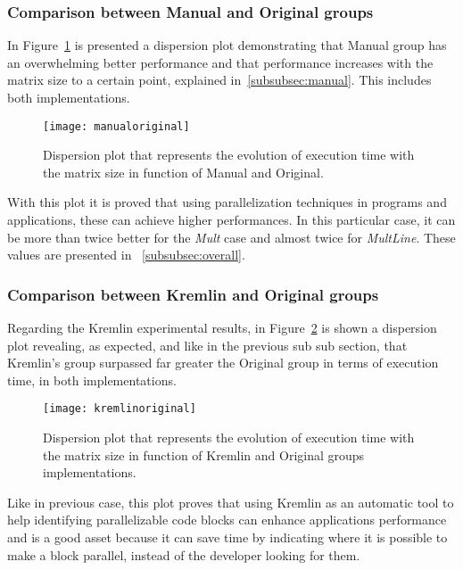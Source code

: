 \subsubsection{Comparison between Manual and Original groups}

In Figure~\ref{fig:manualoriginal} is presented a dispersion plot 
demonstrating that Manual group has  an overwhelming better performance and that performance increases with the matrix size to a certain point, explained in~\ref{subsubsec:manual}. This includes both implementations.
\begin{figure}[htb]
	\begin{center}
		\leavevmode
		\texttt{[image: manualoriginal]}
		\caption{Dispersion plot that represents the evolution of execution time with the matrix size in function of Manual and Original.}
		\label{fig:manualoriginal}
	\end{center}
\end{figure}

With this plot it is proved that using parallelization techniques in programs and applications, these can achieve higher performances. In this particular case, it can be more than twice better for the \textit{Mult} case and almost twice for \textit{MultLine}. These values are presented in ~\ref{subsubsec:overall}.

\subsubsection{Comparison between Kremlin and Original groups}

Regarding the Kremlin experimental results, in Figure~\ref{fig:kremlinoriginal} is shown a dispersion plot revealing, as expected, and like in the previous sub sub section, that Kremlin's group surpassed  far greater the Original group in terms of execution time, in both implementations.

\begin{figure}[htb]
	\begin{center}
		\leavevmode
		\texttt{[image: kremlinoriginal]}
		\caption{Dispersion plot that represents the evolution of execution time with the matrix size in function of  Kremlin and Original groups implementations.}
		\label{fig:kremlinoriginal}
	\end{center}
\end{figure}

Like in previous case, this plot proves that using Kremlin as an automatic tool to help identifying parallelizable code blocks can enhance applications performance and is a good asset because it can save time by indicating where it is possible to make a block parallel, instead of the developer looking for them.

